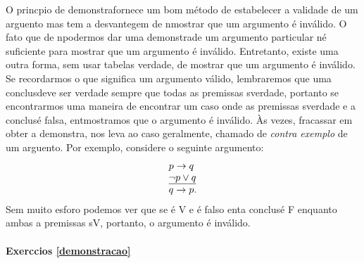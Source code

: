O princ\ih pio de demonstra\cao fornece um bom m\'etodo de estabelecer a validade de um arguento mas tem a desvantegem de n\ao mostrar que um argumento \'e inv\'alido. O fato que de n\ao podermos dar uma demonstra\cao de um argumento particular n\ao \'e suficiente para mostrar que um argumento \'e inv\'alido. Entretanto, existe uma outra forma, sem usar tabelas verdade, de mostrar que um argumento \'e inv\'alido. Se recordarmos o que significa um argumento v\'alido, lembraremos que uma conclus\ao deve ser verdade sempre que todas as premissas s\ao verdade, portanto se encontrarmos uma maneira de encontrar um caso onde as premissas s\ao verdade e a conclus\ao \'e falsa, ent\ao mostramos que o argumento \'e inv\'alido. \`As vezes, fracassar em obter a demonstra\caoi, nos leva ao caso geralmente, chamado de {\it contra exemplo} de um arguento. Por exemplo, considere o seguinte argumento:
\begin{eqnarray*}
\begin{tabular}{l}
$p\to q$ \\
$\underline{\nao p\ou q}$ \\
$q\to p$.
\end{tabular}
\end{eqnarray*}
Sem muito esfor\cc o podemos ver que se \qq \'e V e \pp \'e falso ent\ao a conclus\ao \'e F enquanto ambas a premissas s\ao V, portanto, o argumento \'e inv\'alido.

\paragraph{Exerc\ih cios \ref{demonstracao}}

